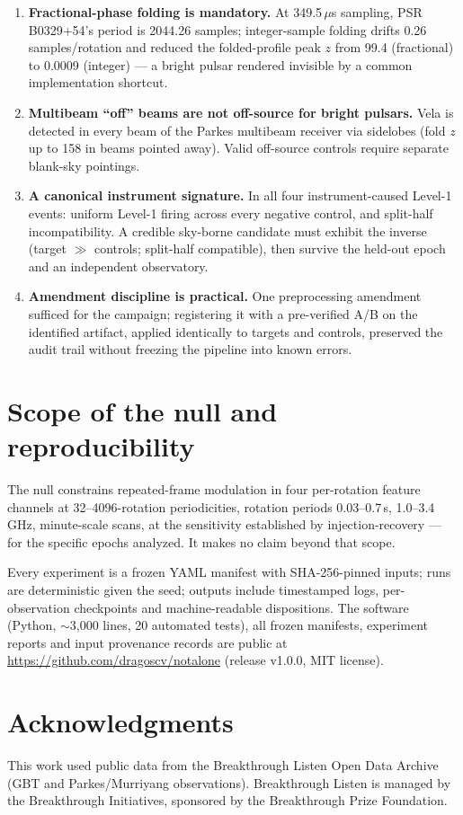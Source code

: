\documentclass[11pt]{article}
\begin{document}
\begin{enumerate}
\item \textbf{Fractional-phase folding is mandatory.} At 349.5\,$\mu$s
sampling, PSR B0329+54's period is 2044.26 samples; integer-sample folding
drifts 0.26 samples/rotation and reduced the folded-profile peak $z$ from 99.4
(fractional) to 0.0009 (integer) --- a bright pulsar rendered invisible by a
common implementation shortcut.
\item \textbf{Multibeam ``off'' beams are not off-source for bright pulsars.}
Vela is detected in every beam of the Parkes multibeam receiver via sidelobes
(fold $z$ up to 158 in beams pointed away). Valid off-source controls require
separate blank-sky pointings.
\item \textbf{A canonical instrument signature.} In all four instrument-caused
Level-1 events: uniform Level-1 firing across every negative control, and
split-half incompatibility. A credible sky-borne candidate must exhibit the
inverse (target $\gg$ controls; split-half compatible), then survive the
held-out epoch and an independent observatory.
\item \textbf{Amendment discipline is practical.} One preprocessing amendment
sufficed for the campaign; registering it with a pre-verified A/B on the
identified artifact, applied identically to targets and controls, preserved
the audit trail without freezing the pipeline into known errors.
\end{enumerate}

\section{Scope of the null and reproducibility}

The null constrains repeated-frame modulation in four per-rotation feature
channels at 32--4096-rotation periodicities, rotation periods 0.03--0.7\,s,
1.0--3.4\,GHz, minute-scale scans, at the sensitivity established by
injection-recovery --- for the specific epochs analyzed. It makes no claim
beyond that scope.

Every experiment is a frozen YAML manifest with SHA-256-pinned inputs;
runs are deterministic given the seed; outputs include timestamped logs,
per-observation checkpoints and machine-readable dispositions. The software
(Python, ${\sim}$3{,}000 lines, 20 automated tests), all frozen manifests,
experiment reports and input provenance records are public at
\url{https://github.com/dragoscv/notalone} (release v1.0.0, MIT license).

\section*{Acknowledgments}
This work used public data from the Breakthrough Listen Open Data Archive
(GBT and Parkes/Murriyang observations). Breakthrough Listen is managed by the
Breakthrough Initiatives, sponsored by the Breakthrough Prize Foundation.
\end{document}
